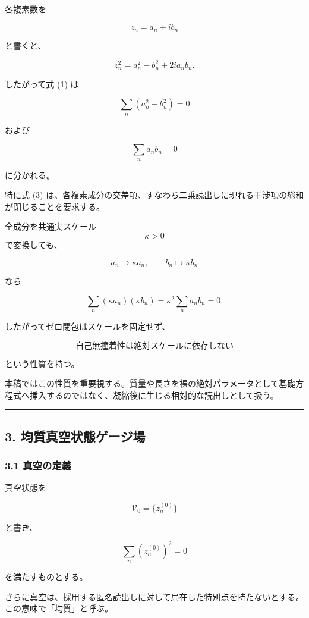 \documentclass[
  a4paper,
]{ltjsarticle}
\begin{document}
各複素数を

\[
z_n=a_n+i b_n
\]

と書くと、

\[
z_n^2
=
a_n^2-b_n^2
+
2i a_n b_n.
\]

したがって式 (1) は

\[
\sum_n(a_n^2-b_n^2)=0
\tag{2}
\]

および

\[
\sum_n a_n b_n=0
\tag{3}
\]

に分かれる。

特に式 (3)
は、各複素成分の交差項、すなわち二乗読出しに現れる干渉項の総和が閉じることを要求する。

全成分を共通実スケール \[\kappa>0\] で変換しても、

\[
a_n\mapsto \kappa a_n,
\qquad
b_n\mapsto \kappa b_n
\]

なら

\[
\sum_n(\kappa a_n)(\kappa b_n)
=
\kappa^2
\sum_n a_n b_n
=
0.
\]

したがってゼロ閉包はスケールを固定せず、

\[
\boxed{
\text{自己無撞着性は絶対スケールに依存しない}
}
\]

という性質を持つ。

本稿ではこの性質を重要視する。質量や長さを裸の絶対パラメータとして基礎方程式へ挿入するのではなく、凝縮後に生じる相対的な読出しとして扱う。

\begin{center}\rule{0.5\linewidth}{0.5pt}\end{center}

\subsection{3.
均質真空状態ゲージ場}\label{ux5747ux8ceaux771fux7a7aux72b6ux614bux30b2ux30fcux30b8ux5834}

\subsubsection{3.1 真空の定義}\label{ux771fux7a7aux306eux5b9aux7fa9}

真空状態を

\[
\mathcal V_0
=
\{z_n^{(0)}\}
\]

と書き、

\[
\sum_n
\left(z_n^{(0)}\right)^2
=
0
\tag{4}
\]

を満たすものとする。

さらに真空は、採用する匿名読出しに対して局在した特別点を持たないとする。この意味で「均質」と呼ぶ。
\end{document}
